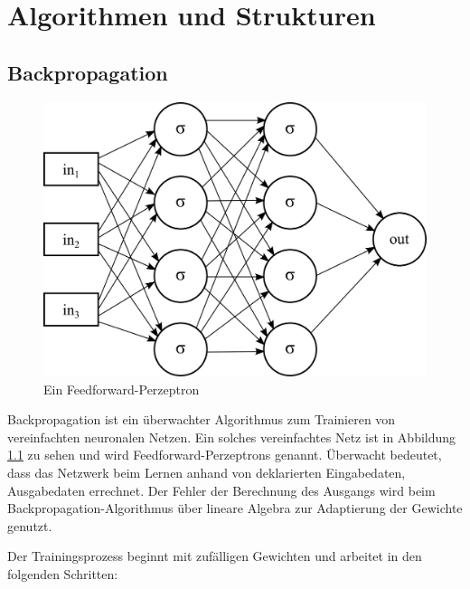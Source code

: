 \chapter{Algorithmen und Strukturen}
\label{cha:algorithmen}


\section{Backpropagation}

\begin{figure}
	\centering
	\includegraphics[scale=1]{images/net-for-bp.png}
	\caption{Ein Feedforward-Perzeptron}
	\label{fig:net-for-bp}
\end{figure}

Backpropagation ist ein überwachter Algorithmus zum Trainieren von vereinfachten neuronalen Netzen. Ein solches vereinfachtes Netz ist in Abbildung \ref{fig:net-for-bp} zu sehen und wird Feedforward-Perzeptrons genannt. Überwacht bedeutet, dass das Netzwerk beim Lernen anhand von deklarierten Eingabedaten, Ausgabedaten errechnet. Der Fehler der Berechnung des Ausgangs wird beim Backpropagation-Algorithmus über lineare Algebra zur Adaptierung der Gewichte genutzt.

Der Trainingsprozess beginnt mit zufälligen Gewichten und arbeitet in den folgenden Schritten:

